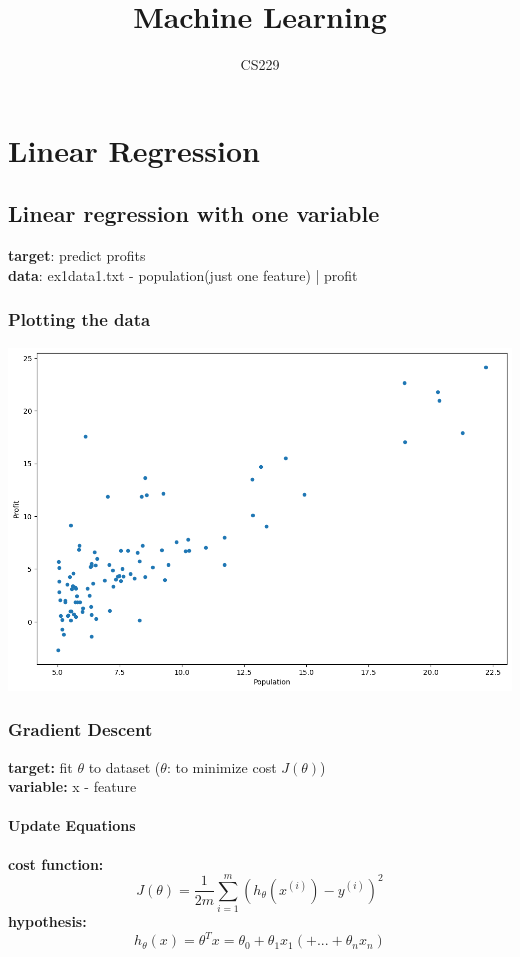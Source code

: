 \documentclass[a4paper, 12pt]{book}
\begin{document}
	\title{Machine Learning}
	\author{CS229}
	\maketitle
	
	\tableofcontents
	
	\chapter{Linear Regression}
	
	\section{Linear regression with one variable}
	\textbf{target}: predict profits \\
	\textbf{data}: ex1data1.txt - population(just one feature) | profit
	
		\subsection{Plotting the data}
	\includegraphics[width=15cm,keepaspectratio]{data}
	
		\subsection{Gradient Descent}
	\textbf{target:} fit $\theta$ to dataset ($\theta$: to minimize cost $J(\theta)$) \\
	\textbf{variable:} x - feature
			\subsubsection{Update Equations}
	\textbf{cost function:} $$J(\theta)=\frac{1}{2m}\sum_{i=1}^{m}(h_\theta(x^{(i)})-y^{(i)})^2$$
	\textbf{hypothesis:}
	$$h_\theta(x)=\theta^Tx=\theta_0+\theta_1x_1(+...+\theta_nx_n)$$
	
\end{document}
